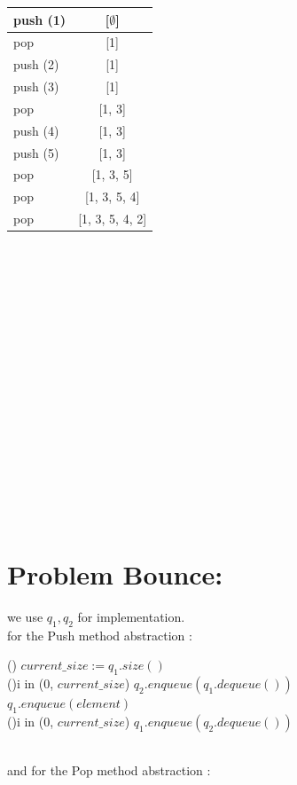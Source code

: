 \documentclass{report}
\begin{document}
        \begin{tabular}{| l | c |}
            \hline
            \Large push (1) &\Large [$\emptyset$]\\
            \hline
            \Large pop &\Large [1]\\
            \hline
            \Large push (2) &\Large [1]\\
            \hline
            \Large push (3) &\Large [1]\\
            \hline
            \Large pop &\Large [1, 3]\\
            \hline
            \Large push (4) &\Large [1, 3]\\
            \hline
            \Large push (5) &\Large [1, 3]\\
            \hline
            \Large pop &\Large [1, 3, 5]\\
            \hline
            \Large pop &\Large [1, 3, 5, 4]\\
            \hline
            \Large pop &\Large [1, 3, 5, 4, 2]\\
            \hline
        \end{tabular}\\
 \\ \\ \\
 \\ \\ \\
 \\ \\ \\
 \\ \\ \\
 \\ \\ \\
    \section*{Problem Bounce:}
        we use $q_1, q_2$ for implementation.\\
    for the Push method abstraction :
        \begin{algorithm}
            \Else(){
                $current\_size := q_1.size()$\\
                \For(){i in (0, $current\_size$)}{
                    $q_2.enqueue(q_1.dequeue())$\\
                }
                $q_1.enqueue(element)$\\
                \For(){i in (0, $current\_size$)}{
                    $q_1.enqueue(q_2.dequeue())$\\
                }
            }
        \end{algorithm}\\
    and for the Pop method abstraction :
        \begin{algorithm}
        \end{algorithm}
\end{document}
